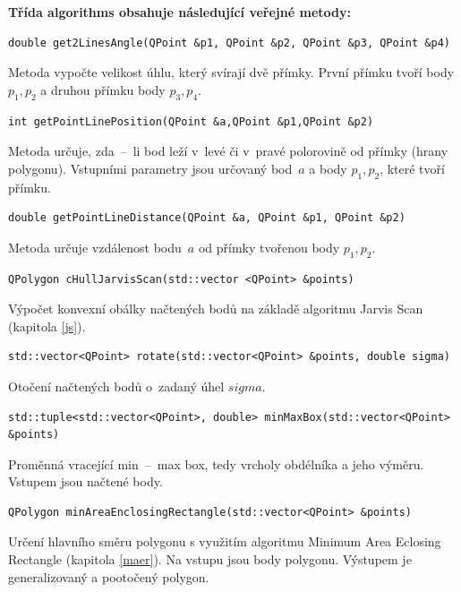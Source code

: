 \documentclass[a4paper, 12pt, oneside, titlepage]{article} %
\begin{document}
\textbf{Třída algorithms obsahuje následující veřejné metody:}

\begin{verbatim}
double get2LinesAngle(QPoint &p1, QPoint &p2, QPoint &p3, QPoint &p4)
\end{verbatim}
Metoda vypočte velikost úhlu, který svírají dvě přímky. První přímku tvoří body $p_1, p_2$ a druhou přímku body $p_3, p_4$.\\

\begin{verbatim}
int getPointLinePosition(QPoint &a,QPoint &p1,QPoint &p2)
\end{verbatim}
Metoda určuje, zda~--~li bod leží v~levé či v~pravé polorovině od přímky (hrany polygonu). Vstupními parametry jsou určovaný bod~$a$ a body $p_1, p_2$, které tvoří přímku.\\

\begin{verbatim}
double getPointLineDistance(QPoint &a, QPoint &p1, QPoint &p2)
\end{verbatim}
Metoda určuje vzdálenost bodu~$a$ od přímky tvořenou body $p_1, p_2$.\\

\begin{verbatim}
QPolygon cHullJarvisScan(std::vector <QPoint> &points)
\end{verbatim}
Výpočet konvexní obálky načtených bodů na základě algoritmu Jarvis Scan (kapitola \ref{js}).\\

\begin{verbatim}
std::vector<QPoint> rotate(std::vector<QPoint> &points, double sigma)
\end{verbatim}
Otočení načtených bodů o~zadaný úhel $sigma$.\\

\begin{verbatim}
std::tuple<std::vector<QPoint>, double> minMaxBox(std::vector<QPoint> &points)
\end{verbatim}
Proměnná vracející min~--~max box, tedy vrcholy obdélníka a jeho výměru. Vstupem jsou načtené body.\\

\begin{verbatim}
QPolygon minAreaEnclosingRectangle(std::vector<QPoint> &points)
\end{verbatim}
Určení hlavního směru polygonu s využitím algoritmu Minimum Area Eclosing Rectangle (kapitola \ref{maer}). Na vstupu jsou body polygonu. Výstupem je generalizovaný a pootočený polygon.\\
\end{document}
